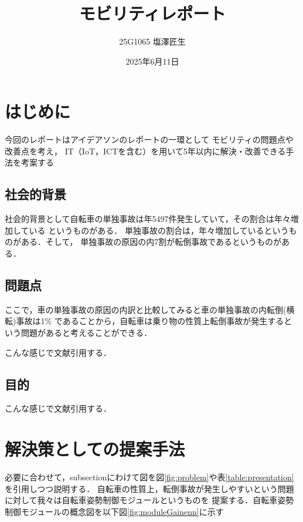 \documentclass[uplatex,dvipdfmx]{jsarticle}
\begin{document}
\title{モビリティレポート}
\author{25G1065 塩澤匠生}
\date{2025年6月11日}
\maketitle
\section{はじめに}

今回のレポートはアイデアソンのレポートの一環として
モビリティの問題点や改善点を考え，
IT（IoT，ICTを含む）を用いて5年以内に解決・改善できる手法を考案する


\subsection{社会的背景}

社会的背景として自転車の単独事故は年5497件発生していて，その割合は年々増加している
というものがある\cite{jikokensuu}．
単独事故の割合は，年々増加しているというものがある．そして，
単独事故の原因の内7割が転倒事故であるというものがある\cite{tandokuWariai}．

\subsection{問題点}

ここで，車の単独事故の原因の内訳と比較してみると車の単独事故の内転倒(横転)事故は1\%
であることから，自転車は乗り物の性質上転倒事故が発生するという問題があると考えることができる．




こんな感じで文献引用する\cite{ref:nobukawa2023,ref:nobukawa2023_2}．

\subsection{目的}
こんな感じで文献引用する\cite{ref:nobukawa2023,ref:nobukawa2023_2}．

\section{解決策としての提案手法}
必要に合わせて，subsectionにわけて図を図\ref{fig:problem}や表\ref{table:presentation}
を引用しつつ説明する．
自転車の性質上，転倒事故が発生しやすいという問題に対して我々は自転車姿勢制御モジュールというものを
提案する．自転車姿勢制御モジュールの概念図を以下図\ref{fig:moduleGainenn}に示す
\end{document}
